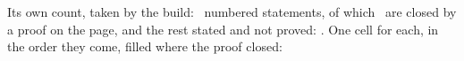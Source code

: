 \documentclass[11pt,twoside]{article}
\theoremstyle{thielethm}
\theoremstyle{thieledef}
\theoremstyle{thieledef}
\theoremstyle{thieledef}
\theoremstyle{thielethm}
\theoremstyle{thieleobs}
\theoremstyle{thielethm}
\begin{document}
Its own count, taken by the build: \ClaimTotal\ numbered statements, of which \PaidTotal\ are
closed by a proof on the page, and the rest stated and not proved: \OpenClaimList. One cell for
each, in the order they come, filled where the proof closed:

\vspace{7pt}
\noindent\LedgerGrid
\endgroup
\clearpage
\thispagestyle{empty}
\vspace*{0pt}
\noindent\BookLabel{\phantom{Devon Thiele}}

\vspace{14pt}
\PageCellFilled
\par\medskip
\end{document}
